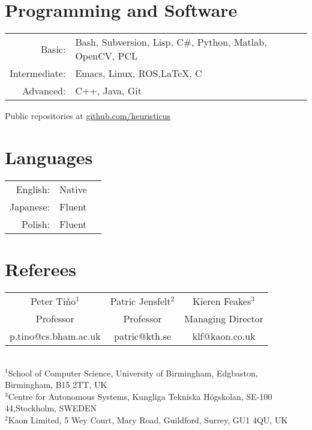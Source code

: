 \documentclass[a4paper,10pt]{article}
\begin{document}
\begin{minipage}[t]{0.47\textwidth}
  \section{Programming and Software}
  \begin{tabular}{rp{}}
    Basic:& Bash, Subversion, Lisp, C\#, Python, Matlab, OpenCV, PCL\\
    Intermediate:& Emacs, Linux, ROS,\LaTeX, C\\
    Advanced:& C++, Java, Git
  \end{tabular}
  \vskip 0.2cm
  \centering
  Public repositories at \href{http://www.github.com/heuristicus}{github.com/heuristicus}
\end{minipage}
\textwidth
\begin{minipage}[t]{0.47\textwidth}
  \section{Languages}
  \begin{tabular}{rlr}%
    English:&Native\\%
    Japanese:&Fluent\\
    Polish:&Fluent\\

  \end{tabular}
\end{minipage}

\section{Referees}
\begin{center}
  \begin{tabular}{c|c|c}
  Peter Ti{\v{n}}o$^1$& Patric Jensfelt$^2$ & Kieren Feakes$^3$ \\ %
  Professor  & Professor & Managing Director\\
  p.tino@cs.bham.ac.uk & patric@kth.se & klf@kaon.co.uk \\
\end{tabular}\\\vspace{0.2cm}
\footnotesize{$^1$School of Computer Science, University of Birmingham, Edgbaston, Birmingham, B15 2TT, UK}\\
\footnotesize{$^3$Centre for Autonomous Systems, Kungliga Tekniska Högskolan,
  SE-100 44,Stockholm, SWEDEN}\\
\footnotesize{$^2$Kaon Limited, 5 Wey Court, Mary Road, Guildford, Surrey, GU1
  4QU, UK}\\
\end{center}
\end{document}
